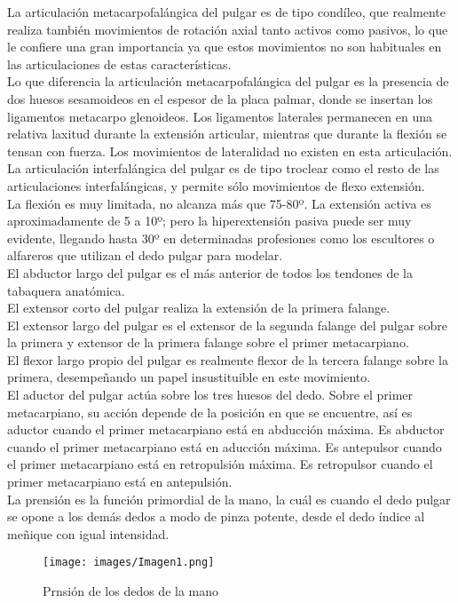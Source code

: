\documentclass{article}
\begin{document}
La articulación metacarpofalángica del pulgar es de tipo condíleo, que realmente realiza también movimientos de rotación axial tanto activos como pasivos, lo que le confiere una gran importancia ya que estos movimientos no son habituales en las articulaciones de estas características.
\\
Lo que diferencia la articulación metacarpofalángica del pulgar es la presencia de dos huesos sesamoideos en el espesor de la placa palmar, donde se insertan los ligamentos metacarpo glenoideos. Los ligamentos laterales permanecen en una relativa laxitud durante la extensión articular, mientras que durante la flexión se tensan con fuerza. Los movimientos de lateralidad no existen en esta articulación.
\\
La articulación interfalángica del pulgar es de tipo troclear como el resto de las articulaciones interfalángicas, y permite sólo movimientos de flexo extensión. 
\\
La flexión es muy limitada, no alcanza más que 75-80º. La extensión activa es aproximadamente de 5 a 10º; pero la hiperextensión pasiva puede ser muy evidente, llegando hasta 30º en determinadas profesiones como los escultores o alfareros que utilizan el dedo pulgar para modelar.
\\
El abductor largo del pulgar es el más anterior de todos los tendones de la tabaquera anatómica. 
\\
El extensor corto del pulgar realiza la extensión de la primera falange.
\\
El extensor largo del pulgar es el extensor de la segunda falange del pulgar sobre la primera y extensor de la primera falange sobre el primer metacarpiano.
\\
El flexor largo propio del pulgar es realmente flexor de la tercera falange sobre la primera, desempeñando un papel insustituible en este movimiento.
\\
El aductor del pulgar actúa sobre los tres huesos del dedo. Sobre el primer metacarpiano, su acción depende de la posición en que se encuentre, así es aductor cuando el primer metacarpiano está en abducción máxima. Es abductor cuando el primer metacarpiano está en aducción máxima. Es antepulsor cuando el primer metacarpiano está en retropulsión máxima. Es retropulsor cuando el primer metacarpiano está en antepulsión.
\\
La prensión es la función primordial de la mano, la cuál es cuando el dedo pulgar se opone a los demás dedos a modo de pinza potente, desde el dedo índice al meñique con igual intensidad.
\begin{figure}[h] %
    \centering
    \texttt{[image: images/Imagen1.png]} %
    \caption{Prnsi\'{o}n de los dedos de la mano}
\end{figure}
\end{document}
